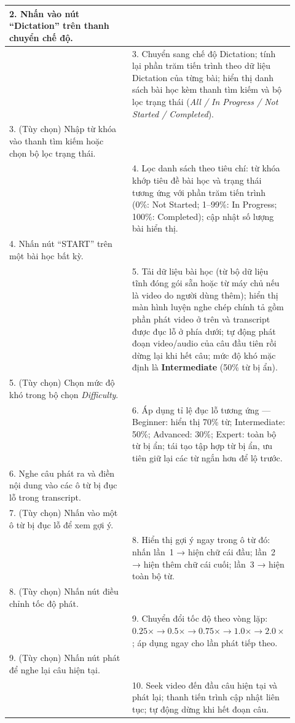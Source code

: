 \begin{longtable}{|p{0.46\linewidth}|p{0.46\linewidth}|}
    2. Nhấn vào nút ``Dictation'' trên thanh chuyển chế độ. & \\ \hline
    & 3. Chuyển sang chế độ Dictation; tính lại phần trăm tiến trình theo dữ liệu Dictation của từng bài; hiển thị danh sách bài học kèm thanh tìm kiếm và bộ lọc trạng thái (\textit{All / In Progress / Not Started / Completed}). \\ \hline
    3. (Tùy chọn) Nhập từ khóa vào thanh tìm kiếm hoặc chọn bộ lọc trạng thái. & \\ \hline
    & 4. Lọc danh sách theo tiêu chí: từ khóa khớp tiêu đề bài học và trạng thái tương ứng với phần trăm tiến trình (0\%: Not Started; 1--99\%: In Progress; 100\%: Completed); cập nhật số lượng bài hiển thị. \\ \hline
    4. Nhấn nút ``START'' trên một bài học bất kỳ. & \\ \hline
    & 5. Tải dữ liệu bài học (từ bộ dữ liệu tĩnh đóng gói sẵn hoặc từ máy chủ nếu là video do người dùng thêm); hiển thị màn hình luyện nghe chép chính tả gồm phần phát video ở trên và transcript được đục lỗ ở phía dưới; tự động phát đoạn video/audio của câu đầu tiên rồi dừng lại khi hết câu; mức độ khó mặc định là \textbf{Intermediate} (50\% từ bị ẩn). \\ \hline
    5. (Tùy chọn) Chọn mức độ khó trong bộ chọn \textit{Difficulty}. & \\ \hline
    & 6. Áp dụng tỉ lệ đục lỗ tương ứng --- Beginner: hiển thị 70\% từ; Intermediate: 50\%; Advanced: 30\%; Expert: toàn bộ từ bị ẩn; tái tạo tập hợp từ bị ẩn, ưu tiên giữ lại các từ ngắn hơn để lộ trước. \\ \hline
    6. Nghe câu phát ra và điền nội dung vào các ô từ bị đục lỗ trong transcript. & \\ \hline
    7. (Tùy chọn) Nhấn vào một ô từ bị đục lỗ để xem gợi ý. & \\ \hline
    & 8. Hiển thị gợi ý ngay trong ô từ đó: nhấn lần~1 → hiện chữ cái đầu; lần~2 → hiện thêm chữ cái cuối; lần~3 → hiện toàn bộ từ. \\ \hline
    8. (Tùy chọn) Nhấn nút điều chỉnh tốc độ phát. & \\ \hline
    & 9. Chuyển đổi tốc độ theo vòng lặp: $0.25\times \to 0.5\times \to 0.75\times \to 1.0\times \to 2.0\times$; áp dụng ngay cho lần phát tiếp theo. \\ \hline
    9. (Tùy chọn) Nhấn nút phát để nghe lại câu hiện tại. & \\ \hline
    & 10. Seek video đến đầu câu hiện tại và phát lại; thanh tiến trình cập nhật liên tục; tự động dừng khi hết đoạn câu. \\ \hline

\end{longtable}
